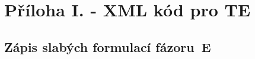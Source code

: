 \documentclass[12pt,a4paper,oneside]{article}
\numberwithin{equation}{section} %
\numberwithin{figure}{section} %
\numberwithin{table}{section} %
\begin{document}
\newpage
{} %
\listoftables

\newpage
\pagestyle{empty} %
\setcounter{page}{1} %
\appendix %
\section*{Příloha I. - XML kód pro TE}
\subsection*{Zápis slabých formulací fázoru~E}
\label{xmlE}
\end{document}
